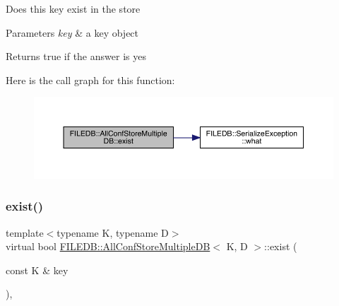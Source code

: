 Does this key exist in the store 
\begin{DoxyParams}{Parameters}
{\em key} & a key object \\
\hline
\end{DoxyParams}
\begin{DoxyReturn}{Returns}
true if the answer is yes 
\end{DoxyReturn}
Here is the call graph for this function\+:
\nopagebreak
\begin{figure}[H]
\begin{center}
\leavevmode
\includegraphics[width=350pt]{d5/dbe/classFILEDB_1_1AllConfStoreMultipleDB_a5c9333af45c37c53c863ad2a07a9843b_cgraph}
\end{center}
\end{figure}
\mbox{\label{classFILEDB_1_1AllConfStoreMultipleDB_a5c9333af45c37c53c863ad2a07a9843b}} 
\subsubsection{\texorpdfstring{exist()}{exist()}\hspace{0.1cm}{\footnotesize\ttfamily [2/3]}}
{\footnotesize\ttfamily template$<$typename K, typename D$>$ \\
virtual bool \mbox{\hyperlink{classFILEDB_1_1AllConfStoreMultipleDB}{F\+I\+L\+E\+D\+B\+::\+All\+Conf\+Store\+Multiple\+DB}}$<$ K, D $>$\+::exist (\begin{DoxyParamCaption}\item[{const K \&}]{key }\end{DoxyParamCaption})\hspace{0.3cm}{\ttfamily [inline]}, {\ttfamily [virtual]}}

